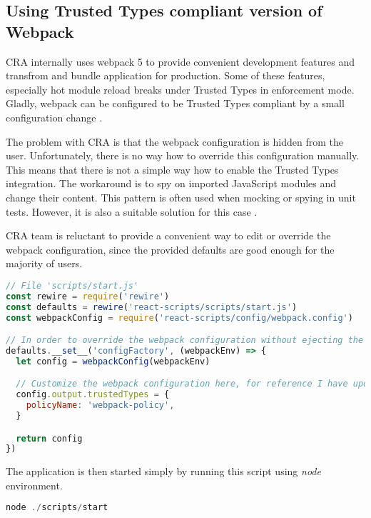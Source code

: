 \subsection{Using Trusted Types compliant version of Webpack}

CRA internally uses webpack 5 to provide convenient development features and transfrom and bundle
application for production. Some of these features, especially hot module reload breaks under
Trusted Types in enforcement mode. Gladly, webpack can be configured to be Trusted Types compliant
by a small configuration change \cite{webpack_tt_config}.

The problem with CRA is that the webpack configuration is hidden from the user. Unfortunately, there
is no way how to override this configuration manually. This means that there is not a simple way how
to enable the Trusted Types integration. The workaround is to spy on imported JavaScript modules and
change their content. This pattern is often used when mocking or spying in unit tests. However,
it is also a suitable solution for this case \cite{cra_modify_webpack_config}.

CRA team is reluctant to provide a convenient way to edit or override the webpack configuration,
since the provided defaults are good enough for the majority of users.

\bigskip
\begin{lstlisting}[language=JavaScript, caption=Script to start React application with Trusted Types enabled in webpack]
// File 'scripts/start.js'
const rewire = require('rewire')
const defaults = rewire('react-scripts/scripts/start.js')
const webpackConfig = require('react-scripts/config/webpack.config')

// In order to override the webpack configuration without ejecting the create-react-app
defaults.__set__('configFactory', (webpackEnv) => {
  let config = webpackConfig(webpackEnv)

  // Customize the webpack configuration here, for reference I have updated webpack externals field
  config.output.trustedTypes = {
    policyName: 'webpack-policy',
  }

  return config
})
\end{lstlisting}

The application is then started simply by running this script using \emph{node} environment.

\bigskip
\begin{lstlisting}[language=JavaScript, caption=Starting the CRA application]
node ./scripts/start
\end{lstlisting}

